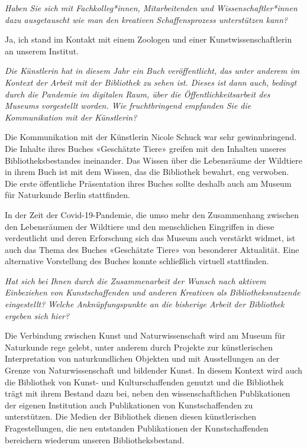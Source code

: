 \documentclass[a4paper,
fontsize=11pt,
oneside,
numbers=noperiodatend,
parskip=half-,
bibliography=totoc,
final
]{scrartcl}
\begin{document}
\emph{Haben Sie sich mit Fachkolleg*innen, Mitarbeitenden und
Wissenschaftler*innen dazu ausgetauscht wie man den kreativen
Schaffensprozess unterstützen kann?}

Ja, ich stand im Kontakt mit einem Zoologen und einer
Kunstwissenschaftlerin an unserem Institut.

\emph{Die Künstlerin hat in diesem Jahr ein Buch veröffentlicht, das
unter anderem im Kontext der Arbeit mit der Bibliothek zu sehen ist.
Dieses ist dann auch, bedingt durch die Pandemie im digitalen Raum, über
die Öffentlichkeitsarbeit des Museums vorgestellt worden. Wie
fruchtbringend empfanden Sie die Kommunikation mit der Künstlerin?}

Die Kommunikation mit der Künstlerin Nicole Schuck war sehr
gewinnbringend. Die Inhalte ihres Buches «Geschätzte Tiere» greifen mit
den Inhalten unseres Bibliotheksbestandes ineinander. Das Wissen über
die Lebensräume der Wildtiere in ihrem Buch ist mit dem Wissen, das die
Bibliothek bewahrt, eng verwoben. Die erste öffentliche Präsentation
ihres Buches sollte deshalb auch am Museum für Naturkunde Berlin
stattfinden.

In der Zeit der Covid-19-Pandemie, die umso mehr den Zusammenhang
zwischen den Lebensräumen der Wildtiere und den menschlichen Eingriffen
in diese verdeutlicht und deren Erforschung sich das Museum auch
verstärkt widmet, ist auch das Thema des Buches «Geschätzte Tiere» von
besonderer Aktualität. Eine alternative Vorstellung des Buches konnte
schließlich virtuell stattfinden.

\emph{Hat sich bei Ihnen durch die Zusammenarbeit der Wunsch nach
aktivem Einbeziehen von Kunstschaffenden und anderen Kreativen als
Bibliotheksnutzende eingestellt? Welche Anknüpfungspunkte an die
bisherige Arbeit der Bibliothek ergeben sich hier?}

Die Verbindung zwischen Kunst und Naturwissenschaft wird am Museum für
Naturkunde rege gelebt, unter anderem durch Projekte zur künstlerischen
Interpretation von naturkundlichen Objekten und mit Ausstellungen an der
Grenze von Naturwissenschaft und bildender Kunst. In diesem Kontext wird
auch die Bibliothek von Kunst- und Kulturschaffenden genutzt und die
Bibliothek trägt mit ihrem Bestand dazu bei, neben den
wissenschaftlichen Publikationen der eigenen Institution auch
Publikationen von Kunstschaffenden zu unterstützen. Die Medien der
Bibliothek dienen diesen künstlerischen Fragestellungen, die neu
entstanden Publikationen der Kunstschaffenden bereichern wiederum
unseren Bibliotheksbestand.
\end{document}
